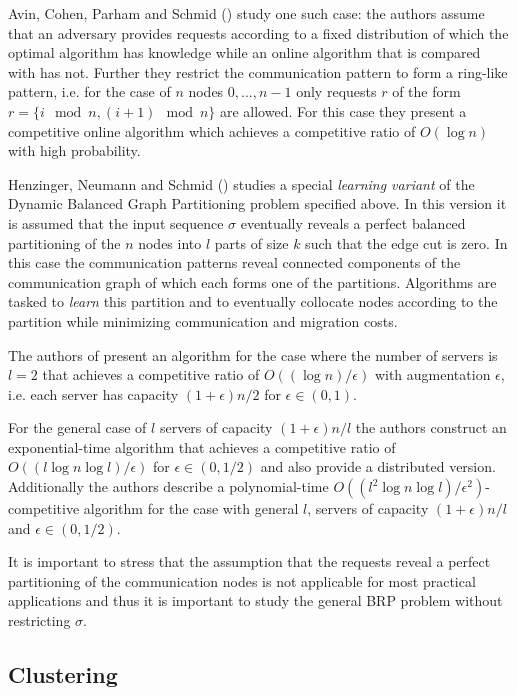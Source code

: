 \documentclass[a4paper,xcolor=dvipsnames, tikz, 12pt]{article}
\newcommand{\opt}{\text{O{\scriptsize PT}}}
\theoremstyle{definition}
\begin{document}
	Avin, Cohen, Parham and Schmid (\cite{Avin2018}) study one such case: the authors assume that an adversary provides requests according to a fixed distribution of which the optimal algorithm \opt{} has knowledge while an online algorithm that is compared with \opt{} has not. Further they restrict the communication pattern to form a ring-like pattern, i.e. for the case of $n$ nodes $0,...,n-1$ only requests $r$ of the form $r=\{i \mod n, (i+1)\mod n\}$ are allowed. For this case they present a competitive online algorithm which achieves a competitive ratio of $O(\log n)$ with high probability.	
	
	Henzinger, Neumann and Schmid (\cite{Henzinger2019}) studies a special \textit{learning variant} of the Dynamic Balanced Graph Partitioning problem specified above. In this version it is assumed that the input sequence $\sigma$ eventually reveals a perfect balanced partitioning of the $n$ nodes into $l$ parts of size $k$ such that the edge cut is zero. In this case the communication patterns reveal connected components of the communication graph of which each forms one of the partitions. Algorithms are tasked to \textit{learn} this partition and to eventually collocate nodes according to the partition while minimizing communication and migration costs.
	
	The authors of \cite{Henzinger2019} present an algorithm for the case where the number of servers is $l=2$ that achieves a competitive ratio of $O((\log n)/\epsilon)$ with augmentation $\epsilon$, i.e. each server has capacity $(1+\epsilon)n/2$ for $\epsilon\in(0,1)$.
	
	For the general case of $l$ servers of capacity $(1+\epsilon)n/l$ the authors construct an exponential-time algorithm that achieves a competitive ratio of $O((l\log n \log l)/\epsilon)$ for $\epsilon\in(0,1/2)$ and also provide a distributed version.
	Additionally the authors describe a polynomial-time $O((l^2\log n\log l)/\epsilon^2)$-competitive algorithm for the case with general $l$, servers of capacity $(1+\epsilon)n/l$ and $\epsilon\in(0,1/2)$.
	
	It is important to stress that the assumption that the requests reveal a perfect partitioning of the communication nodes is not applicable for most practical applications and thus it is important to study the general BRP problem without restricting $\sigma$.
	
	\subsection{Clustering}
	
\end{document}
